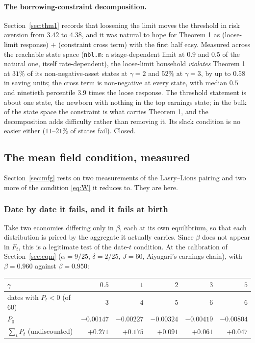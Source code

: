 \paragraph{The borrowing-constraint decomposition.} Section~\ref{sec:thm1} records that loosening the
limit moves the threshold in risk aversion from $3.42$ to $4.38$, and it was natural to hope for
Theorem 1 as (loose-limit response) $+$ (constraint cross term) with the first half easy. Measured
across the reachable state space (\texttt{nbl.m}: a stage-dependent limit at $0.9$ and $0.5$ of the
natural one, itself rate-dependent), the loose-limit household \emph{violates} Theorem 1 at $31\%$ of
its non-negative-asset states at $\gamma=2$ and $52\%$ at $\gamma=3$, by up to $0.58$ in saving units;
the cross term is non-negative at every state, with median $0.5$ and ninetieth percentile $3.9$ times
the loose response. The threshold statement is about one state, the newborn with nothing in the top
earnings state; in the bulk of the state space the constraint is what carries Theorem 1, and the
decomposition adds difficulty rather than removing it. Its slack condition is no easier either
($11$--$21\%$ of states fail). Closed.

\subsection*{The mean field condition, measured}

Section~\ref{sec:mfg} rests on two measurements of the Lasry--Lions pairing and two more of the
condition \eqref{eq:W} it reduces to. They are here.

\subsubsection*{Date by date it fails, and it fails at birth}

Take two economies differing only in $\beta$, each at its own equilibrium, so that each
distribution is priced by the aggregate it actually carries. Since $\beta$ does not appear in
$F_t$, this is a legitimate test of the date-$t$ condition. At the calibration of
Section~\ref{sec:eqm} ($\alpha=9/25$, $\delta=2/25$, $J=60$, Aiyagari's earnings chain), with
$\beta=0.960$ against $\beta=0.950$:

\begin{center}
\begin{tabular}{lrrrrr}
\toprule
$\gamma$ & $0.5$ & $1$ & $2$ & $3$ & $5$\\
\midrule
dates with $P_t<0$ (of $60$) & $3$ & $4$ & $5$ & $6$ & $6$\\
$P_0$ & $-0.00147$ & $-0.00227$ & $-0.00324$ & $-0.00419$ & $-0.00804$\\
$\sum_t P_t$ (undiscounted) & $+0.271$ & $+0.175$ & $+0.091$ & $+0.061$ & $+0.047$\\
\bottomrule
\end{tabular}
\end{center}

